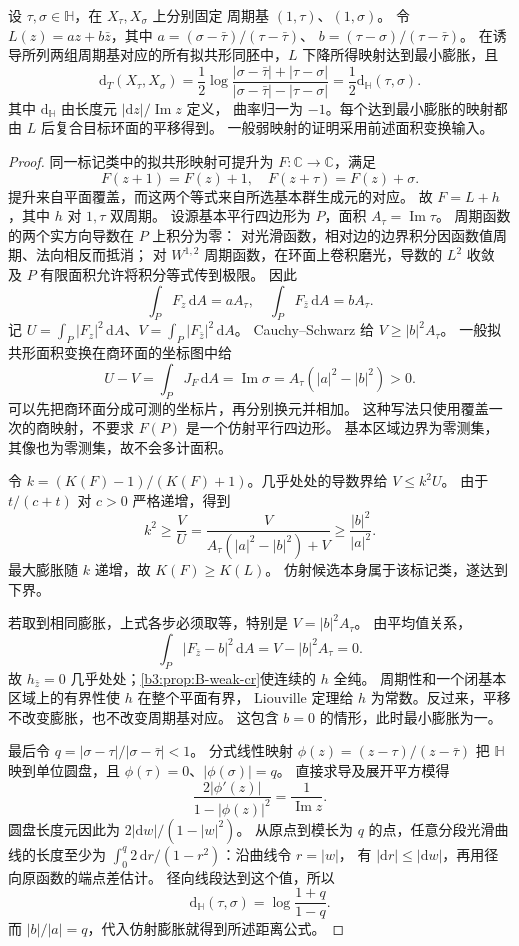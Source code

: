 \begin{proposition}[标记环面的最小畸变]\label{b3:prop:B-torus-extremal}
设 \(\tau,\sigma\in\mathbb H\)，在 \(X_\tau,X_\sigma\) 上分别固定
周期基 \((1,\tau)\)、\((1,\sigma)\)。
令 \(L(z)=az+b\bar z\)，其中
\(a=(\sigma-\bar\tau)/(\tau-\bar\tau)\)、
\(b=(\tau-\sigma)/(\tau-\bar\tau)\)。
在诱导所列两组周期基对应的所有拟共形同胚中，\(L\) 下降所得映射达到最小膨胀，且
\[
 \mathrm d_T(X_\tau,X_\sigma)
 =\frac12\log
 \frac{|\sigma-\bar\tau|+|\tau-\sigma|}
      {|\sigma-\bar\tau|-|\tau-\sigma|}
 =\frac12\mathrm d_{\mathbb H}(\tau,\sigma).
\]
其中 \(\mathrm d_{\mathbb H}\) 由长度元 \(|\mathrm dz|/\operatorname{Im}z\) 定义，
曲率归一为 \(-1\)。每个达到最小膨胀的映射都由 \(L\) 后复合目标环面的平移得到。
一般弱映射的证明采用前述面积变换输入。
\end{proposition}
\begin{proof}
同一标记类中的拟共形映射可提升为 \(F:\mathbb C\rightarrow\mathbb C\)，满足
\[
 F(z+1)=F(z)+1,\quad F(z+\tau)=F(z)+\sigma.
\]
提升来自平面覆盖，而这两个等式来自所选基本群生成元的对应。
故 \(F=L+h\)，其中 \(h\) 对 \(1,\tau\) 双周期。
设源基本平行四边形为 \(P\)，面积 \(A_\tau=\operatorname{Im}\tau\)。
周期函数的两个实方向导数在 \(P\) 上积分为零：
对光滑函数，相对边的边界积分因函数值周期、法向相反而抵消；
对 \(W^{1,2}\) 周期函数，在环面上卷积磨光，导数的 \(L^2\) 收敛
及 \(P\) 有限面积允许将积分等式传到极限。
因此
\[
 \int_P F_z\,\mathrm dA=aA_\tau,\quad
 \int_P F_{\bar z}\,\mathrm dA=bA_\tau.
\]
记 \(U=\int_P|F_z|^2\,\mathrm dA\)、\(V=\int_P|F_{\bar z}|^2\,\mathrm dA\)。
Cauchy--Schwarz 给 \(V\ge|b|^2 A_\tau\)。
一般拟共形面积变换在商环面的坐标图中给
\[
 U-V=\int_P J_F\,\mathrm dA
 =\operatorname{Im}\sigma=A_\tau(|a|^2-|b|^2)>0.
\]
可以先把商环面分成可测的坐标片，再分别换元并相加。
这种写法只使用覆盖一次的商映射，不要求 \(F(P)\) 是一个仿射平行四边形。
基本区域边界为零测集，其像也为零测集，故不会多计面积。

令 \(k=(K(F)-1)/(K(F)+1)\)。几乎处处的导数界给 \(V\le k^2U\)。
由于 \(t/(c+t)\) 对 \(c>0\) 严格递增，得到
\[
 k^2\ge\frac VU
 =\frac{V}{A_\tau(|a|^2-|b|^2)+V}
 \ge\frac{|b|^2}{|a|^2}.
\]
最大膨胀随 \(k\) 递增，故 \(K(F)\ge K(L)\)。
仿射候选本身属于该标记类，遂达到下界。

若取到相同膨胀，上式各步必须取等，特别是 \(V=|b|^2 A_\tau\)。
由平均值关系，
\[
 \int_P|F_{\bar z}-b|^2\,\mathrm dA=V-|b|^2 A_\tau=0.
\]
故 \(h_{\bar z}=0\) 几乎处处；\cref{b3:prop:B-weak-cr}使连续的 \(h\) 全纯。
周期性和一个闭基本区域上的有界性使 \(h\) 在整个平面有界，
Liouville 定理给 \(h\) 为常数。反过来，平移不改变膨胀，也不改变周期基对应。
这包含 \(b=0\) 的情形，此时最小膨胀为一。

最后令 \(q=|\sigma-\tau|/|\sigma-\bar\tau|<1\)。
分式线性映射 \(\phi(z)=(z-\tau)/(z-\bar\tau)\) 把
\(\mathbb H\) 映到单位圆盘，且 \(\phi(\tau)=0\)、\(|\phi(\sigma)|=q\)。
直接求导及展开平方模得
\[
 \frac{2|\phi'(z)|}{1-|\phi(z)|^2}=\frac1{\operatorname{Im}z}.
\]
圆盘长度元因此为 \(2|\mathrm dw|/(1-|w|^2)\)。
从原点到模长为 \(q\) 的点，任意分段光滑曲线的长度至少为
\(\int_0^q 2\,\mathrm dr/(1-r^2)\)：沿曲线令 \(r=|w|\)，
有 \(|\mathrm dr|\le|\mathrm dw|\)，再用径向原函数的端点差估计。
径向线段达到这个值，所以
\[
 \mathrm d_{\mathbb H}(\tau,\sigma)
 =\log\frac{1+q}{1-q}.
\]
而 \(|b|/|a|=q\)，代入仿射膨胀就得到所述距离公式。
\end{proof}
